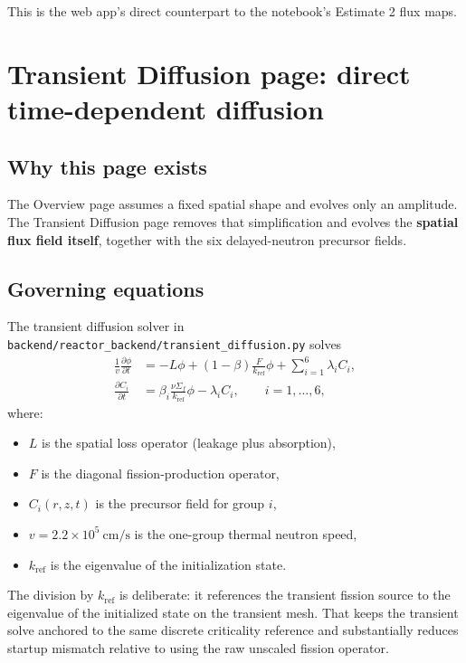 \documentclass[11pt]{article}
\begin{document}
This is the web app's direct counterpart to the notebook's Estimate 2 flux maps.

\section{Transient Diffusion page: direct time-dependent diffusion}

\subsection{Why this page exists}

The Overview page assumes a fixed spatial shape and evolves only an amplitude.
The Transient Diffusion page removes that simplification and evolves the
\textbf{spatial flux field itself}, together with the six delayed-neutron
precursor fields.

\subsection{Governing equations}

The transient diffusion solver in
\texttt{backend/reactor\_backend/transient\_diffusion.py} solves
\begin{align}
\frac{1}{v}\frac{\partial \phi}{\partial t}
&=
-L\phi
+ (1-\beta)\frac{F}{k_{\mathrm{ref}}}\phi
+ \sum_{i=1}^{6}\lambda_i C_i,
\\
\frac{\partial C_i}{\partial t}
&=
\beta_i \frac{\nu\Sigma_f}{k_{\mathrm{ref}}}\phi
- \lambda_i C_i,
\qquad i=1,\dots,6,
\end{align}
where:
\begin{itemize}
  \item $L$ is the spatial loss operator (leakage plus absorption),
  \item $F$ is the diagonal fission-production operator,
  \item $C_i(r,z,t)$ is the precursor field for group $i$,
  \item $v = 2.2\times 10^5\ \mathrm{cm/s}$ is the one-group thermal neutron speed,
  \item $k_{\mathrm{ref}}$ is the eigenvalue of the initialization state.
\end{itemize}

The division by $k_{\mathrm{ref}}$ is deliberate: it references the transient
fission source to the eigenvalue of the initialized state on the transient mesh.
That keeps the transient solve anchored to the same discrete criticality
reference and substantially reduces startup mismatch relative to using the raw
unscaled fission operator.
\end{document}
